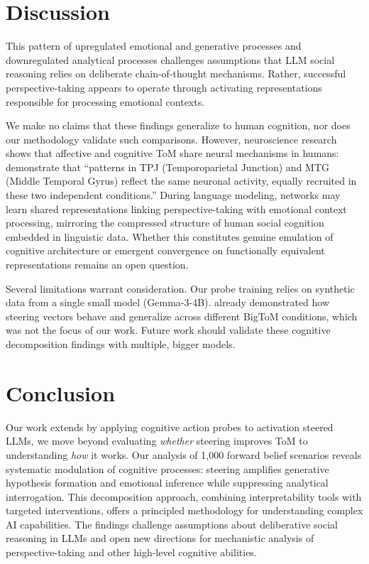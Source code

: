 \documentclass[letterpaper]{article}
\begin{document}
\section{Discussion}

This pattern of upregulated emotional and generative processes and downregulated analytical processes challenges assumptions that LLM social reasoning relies on deliberate chain-of-thought mechanisms. Rather, successful perspective-taking appears to operate through activating representations responsible for processing emotional contexts.

We make no claims that these findings generalize to human cognition, nor does our methodology validate such comparisons. However, neuroscience research shows that affective and cognitive ToM share neural mechanisms in humans: \citet{Corradi2014} demonstrate that ``patterns in TPJ (Temporoparietal Junction) and MTG (Middle Temporal Gyrus) reflect the same neuronal activity, equally recruited in these two independent conditions.'' During language modeling, networks may learn shared representations linking perspective-taking with emotional context processing, mirroring the compressed structure of human social cognition embedded in linguistic data. Whether this constitutes genuine emulation of cognitive architecture or emergent convergence on functionally equivalent representations remains an open question.

Several limitations warrant consideration. Our probe training relies on synthetic data from a single small model (Gemma-3-4B). \citet{Bortoletto2024} already demonstrated how steering vectors behave and generalize across different BigToM conditions, which was not the focus of our work. Future work should validate these cognitive decomposition findings with multiple, bigger models.

\section{Conclusion}

Our work extends \citet{Bortoletto2024} by applying cognitive action probes to activation steered LLMs, we move beyond evaluating \textit{whether} steering improves ToM to understanding \textit{how} it works. Our analysis of 1,000 forward belief scenarios reveals systematic modulation of cognitive processes: steering amplifies generative hypothesis formation and emotional inference while suppressing analytical interrogation. This decomposition approach, combining interpretability tools with targeted interventions, offers a principled methodology for understanding complex AI capabilities. The findings challenge assumptions about deliberative social reasoning in LLMs and open new directions for mechanistic analysis of perspective-taking and other high-level cognitive abilities.
\end{document}
